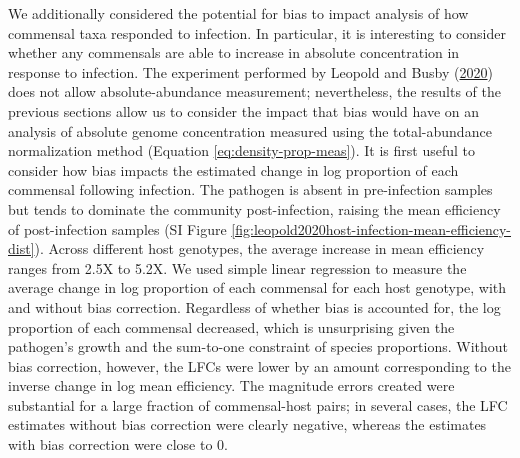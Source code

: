 \documentclass[
]{article}
\begin{document}
We additionally considered the potential for bias to impact analysis of how commensal taxa responded to infection.
In particular, it is interesting to consider whether any commensals are able to increase in absolute concentration in response to infection.
The experiment performed by Leopold and Busby (\protect\hyperlink{ref-leopold2020host}{2020}) does not allow absolute-abundance measurement; nevertheless, the results of the previous sections allow us to consider the impact that bias would have on an analysis of absolute genome concentration measured using the total-abundance normalization method (Equation \eqref{eq:density-prop-meas}).
It is first useful to consider how bias impacts the estimated change in log proportion of each commensal following infection.
The pathogen is absent in pre-infection samples but tends to dominate the community post-infection, raising the mean efficiency of post-infection samples (SI Figure \ref{fig:leopold2020host-infection-mean-efficiency-dist}).
Across different host genotypes, the average increase in mean efficiency ranges from 2.5X to 5.2X.
We used simple linear regression to measure the average change in log proportion of each commensal for each host genotype, with and without bias correction.
Regardless of whether bias is accounted for, the log proportion of each commensal decreased, which is unsurprising given the pathogen's growth and the sum-to-one constraint of species proportions.
Without bias correction, however, the LFCs were lower by an amount corresponding to the inverse change in log mean efficiency.
The magnitude errors created were substantial for a large fraction of commensal-host pairs; in several cases, the LFC estimates without bias correction were clearly negative, whereas the estimates with bias correction were close to 0.
\end{document}
